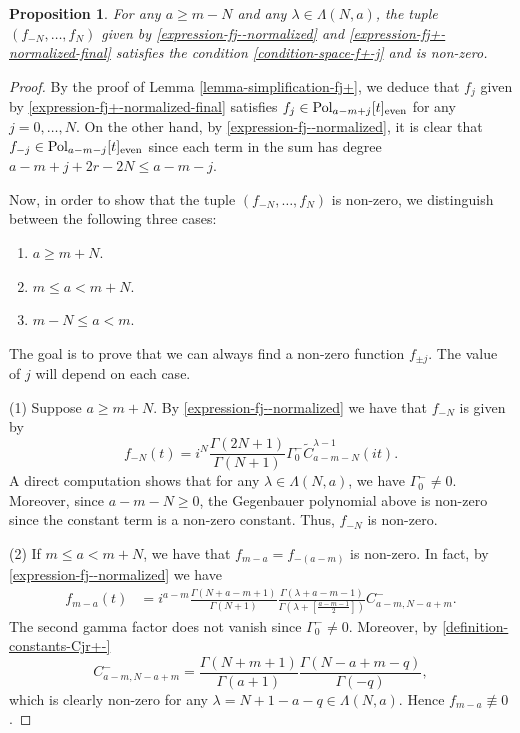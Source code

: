 \documentclass[12pt, pdflatex, a4paper]{article}
\theoremstyle{plain}
\newtheorem{prop}[thm]{Proposition}
\theoremstyle{definition}
\def\Geg{\widetilde{C}}
\def\Pol{\text{\normalfont{Pol}}}
\begin{document}
\begin{prop}\label{prop-solution-nonzero} For any $a \geq m-N$ and any $\lambda \in \Lambda(N,a)$, the tuple $(f_{-N}, \ldots, f_N)$ given by \eqref{expression-fj--normalized} and \eqref{expression-fj+-normalized-final} satisfies the condition \eqref{condition-space-f+-j} and is non-zero.
\end{prop}
\begin{proof}
By the proof of Lemma \ref{lemma-simplification-fj+}, we deduce that $f_j$ given by \eqref{expression-fj+-normalized-final} satisfies $f_j \in \Pol_{a-m+j}[t]_\text{even}$ for any $j = 0, \ldots, N$. On the other hand, by \eqref{expression-fj--normalized}, it is clear that $f_{-j} \in \Pol_{a-m-j}[t]_\text{even}$ since each term in the sum has degree $a-m+j+2r-2N \leq a-m-j$. 

Now, in order to show that the tuple $(f_{-N}, \ldots, f_N)$ is non-zero, we distinguish between the following three cases:
\begin{enumerate}[label=\normalfont{(\arabic*)}]
\item $a \geq m+N$.
\item $m \leq a < m+N$.
\item $m-N \leq a < m$.
\end{enumerate}
The goal is to prove that we can always find a non-zero function $f_{\pm j}$. The value of $j$ will depend on each case.

(1) Suppose $a\geq m+N$. By \eqref{expression-fj--normalized} we have that $f_{-N}$ is given by
\begin{equation*}
f_{-N}(t) = i^N\frac{\Gamma(2N+1)}{\Gamma(N+1)}\Gamma_0^-\Geg_{a-m-N}^{\lambda-1}(it).
\end{equation*}
A direct computation shows that for any $\lambda \in \Lambda(N,a)$, we have $\Gamma_0^- \neq 0$. Moreover, since $a-m-N \geq 0$, the Gegenbauer polynomial above is non-zero since the constant term is a non-zero constant. Thus, $f_{-N}$ is non-zero.

(2) If $m \leq a < m+N$, we have that $f_{m-a} = f_{-(a-m)}$ is non-zero. In fact, by \eqref{expression-fj--normalized} we have
\begin{align*}
f_{m-a}(t) &= i^{a-m}\frac{\Gamma(N+a-m+1)}{\Gamma(N+1)}\frac{\Gamma\left(\lambda+a-m-1\right)}{\Gamma\left(\lambda+\left[\frac{a-m-1}{2}\right]\right)}C_{a-m, N-a+m}^-.
\end{align*}
The second gamma factor does not vanish since $\Gamma_0^- \neq 0$. Moreover, by \eqref{definition-constants-Cjr+-}
\begin{equation*}
C_{a-m, N-a+m}^- = \frac{\Gamma(N+m+1)}{\Gamma(a+1)}\frac{\Gamma(N-a+m-q)}{\Gamma(-q)},
\end{equation*}
which is clearly non-zero for any $\lambda = N+1-a-q \in \Lambda(N,a)$. Hence $f_{m-a} \not\equiv 0$.


\end{proof}
\end{document}
